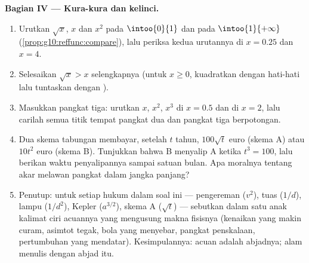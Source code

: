 \begin{problem}
\medskip
\noindent\textbf{Bagian IV --- Kura-kura dan kelinci.}
\begin{enumerate}[resume]
  \item Urutkan $\sqrt x$, $x$ dan $x^2$ pada $\intoo{0}{1}$ dan pada
        $\intoo{1}{+\infty}$
        (\cref{prop:g10:reffunc:compare}), lalu periksa kedua
        urutannya di $x = 0.25$ dan $x = 4$.
  \item Selesaikan $\sqrt x > x$ selengkapnya (untuk $x \geq 0$, kuadratkan
        dengan hati-hati lalu tuntaskan dengan ).
  \item Masukkan pangkat tiga: urutkan $x$, $x^2$, $x^3$ di
        $x = 0.5$ dan di $x = 2$, lalu carilah semua titik tempat
         pangkat dua dan pangkat tiga berpotongan.
  \item Dua skema tabungan membayar, setelah $t$ tahun, $100\sqrt t$
        euro (skema A) atau $10 t^2$ euro (skema B). Tunjukkan bahwa
        B menyalip A ketika $t^3 = 100$, lalu berikan waktu
        penyalipannya sampai satuan bulan. Apa moralnya tentang akar melawan
        pangkat dalam jangka panjang?
  \item Penutup: untuk setiap hukum dalam soal ini --- pengereman
        ($v^2$), tuas ($1/d$), lampu ($1/d^2$), Kepler
        ($a^{3/2}$), skema A ($\sqrt t$) --- sebutkan dalam satu anak kalimat
        ciri  acuannya yang mengusung
        makna fisisnya (kenaikan yang makin curam, asimtot tegak,
        bola yang menyebar, pangkat penskalaan, pertumbuhan yang mendatar).
        Kesimpulannya:  acuan adalah abjadnya;
        alam menulis dengan abjad itu.

\end{enumerate}
\end{problem}
